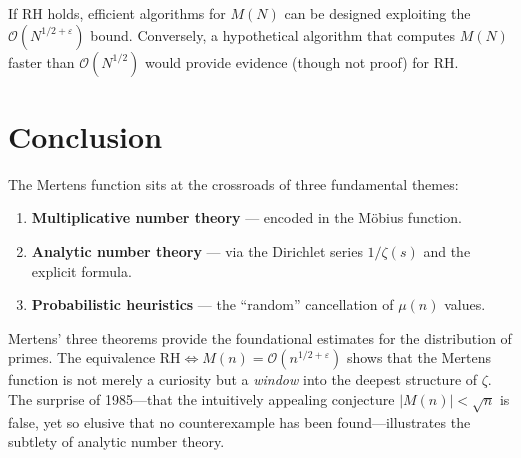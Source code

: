 \documentclass[12pt,a4paper]{amsart}
\theoremstyle{definition}
\newcommand{\BigO}{\mathcal{O}}
\begin{document}
If RH holds, efficient algorithms for $M(N)$ can be designed exploiting
the $\BigO(N^{1/2+\varepsilon})$ bound.  Conversely, a hypothetical algorithm
that computes $M(N)$ faster than $\BigO(N^{1/2})$ would provide evidence
(though not proof) for RH.

\section*{Conclusion}

The Mertens function sits at the crossroads of three fundamental themes:
\begin{enumerate}[label=(\roman*)]
  \item \textbf{Multiplicative number theory} --- encoded in the Möbius function.
  \item \textbf{Analytic number theory} --- via the Dirichlet series $1/\zeta(s)$
        and the explicit formula.
  \item \textbf{Probabilistic heuristics} --- the ``random'' cancellation of
        $\mu(n)$ values.
\end{enumerate}

Mertens' three theorems provide the foundational estimates for the distribution
of primes.  The equivalence $\text{RH} \Leftrightarrow M(n)=\BigO(n^{1/2+\varepsilon})$
shows that the Mertens function is not merely a curiosity but a \emph{window}
into the deepest structure of $\zeta$.  The surprise of 1985---that the
intuitively appealing conjecture $|M(n)| < \sqrt{n}$ is false, yet so
elusive that no counterexample has been found---illustrates the subtlety of
analytic number theory.
\end{document}
